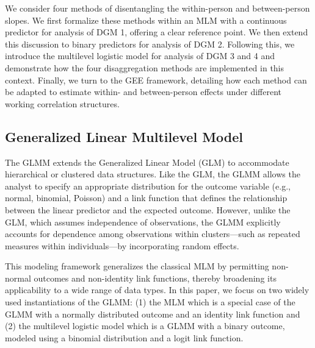We consider four methods of disentangling the within-person and between-person slopes. We first formalize these methods within an MLM with a continuous predictor for analysis of DGM 1, offering a clear reference point. We then extend this discussion to binary predictors for analysis of DGM 2. Following this, we introduce the multilevel logistic model for analysis of DGM 3 and 4 and demonstrate how the four disaggregation methods are implemented in this context. Finally, we turn to the GEE framework, detailing how each method can be adapted to estimate within- and between-person effects under different working correlation structures.


\subsection{Generalized Linear Multilevel Model}

The GLMM extends the Generalized Linear Model (GLM) to accommodate hierarchical or clustered data structures. Like the GLM, the GLMM allows the analyst to specify an appropriate distribution for the outcome variable (e.g., normal, binomial, Poisson) and a link function that defines the relationship between the linear predictor and the expected outcome. However, unlike the GLM, which assumes independence of observations, the GLMM explicitly accounts for dependence among observations within clusters—such as repeated measures within individuals—by incorporating random effects.

This modeling framework generalizes the classical MLM by permitting non-normal outcomes and non-identity link functions, thereby broadening its applicability to a wide range of data types. In this paper, we focus on two widely used instantiations of the GLMM: (1) the MLM which is a special case of the GLMM with a normally distributed outcome and an identity link function and (2) the multilevel logistic model which is a GLMM with a binary outcome, modeled using a binomial distribution and a logit link function.

